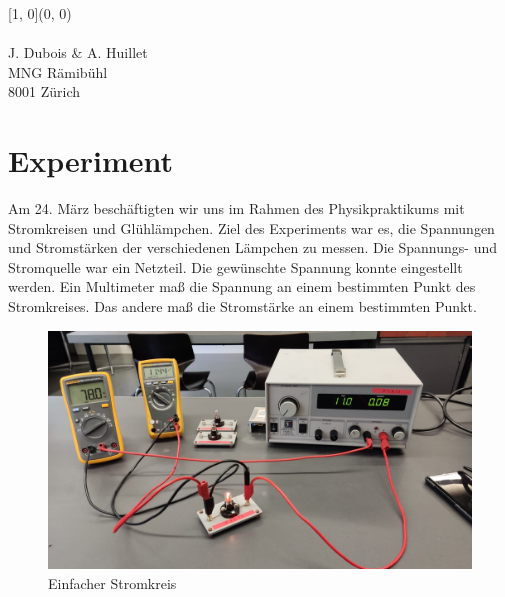 \documentclass[12pt, a4paper, twoside]{article}
\begin{document}
    \begin{textblock}{\pgfmathresult}[1, 0](0, 0)
    \noindent
    \\\\ J. Dubois \& A. Huillet\\ MNG Rämibühl\\ 8001 Zürich
    \end{textblock}
    

    \newpage
    
    \section{Experiment}
    Am 24. März beschäftigten wir uns im Rahmen des Physikpraktikums mit Stromkreisen und Glühlämpchen.
    Ziel des Experiments war es, die Spannungen und Stromstärken der verschiedenen Lämpchen zu messen.
    Die Spannungs- und Stromquelle war ein Netzteil. Die gewünschte Spannung konnte eingestellt werden. Ein Multimeter maß die Spannung an einem bestimmten Punkt des Stromkreises.
    Das andere maß die Stromstärke an einem bestimmten Punkt.
    \vspace{1cm}\\
    \begin{figure}[h!]
        \begin{adjustbox}{scale=0.25}
            \includegraphics{Experiment.jpeg}
        \end{adjustbox}
        \caption{Einfacher Stromkreis}        
    \end{figure}
    
    \newpage
\end{document}
